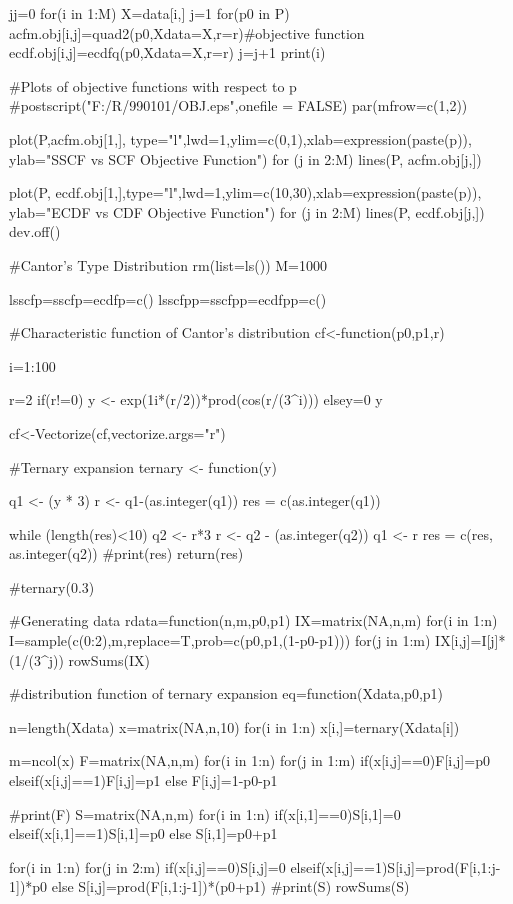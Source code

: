 jj=0
 for(i in 1:M)
 {
  X=data[i,]
          j=1
          for(p0 in P){
          acfm.obj[i,j]=quad2(p0,Xdata=X,r=r)#objective function
          ecdf.obj[i,j]=ecdfq(p0,Xdata=X,r=r)
          j=j+1
          }
  print(i)
}

#Plots of objective functions with respect to p
#postscript("F:/R/990101/OBJ.eps",onefile = FALSE)
par(mfrow=c(1,2))

plot(P,acfm.obj[1,], type="l",lwd=1,ylim=c(0,1),xlab=expression(paste(p)),
ylab="SSCF vs SCF Objective Function")
for (j in 2:M) lines(P, acfm.obj[j,])

plot(P, ecdf.obj[1,],type="l",lwd=1,ylim=c(10,30),xlab=expression(paste(p)),
ylab="ECDF vs CDF Objective Function")
for (j in 2:M) lines(P, ecdf.obj[j,])
dev.off()

#Cantor's Type Distribution
rm(list=ls())
M=1000

lsscfp=sscfp=ecdfp=c()
lsscfpp=sscfpp=ecdfpp=c()

#Characteristic function of Cantor's distribution
cf<-function(p0,p1,r){
i=1:100

r=2
    if(r!=0){
      y <- exp(1i*(r/2))*prod(cos(r/(3^i)))
    }
    else{y=0}
    y
}
cf<-Vectorize(cf,vectorize.args="r")

#Ternary expansion
ternary <- function(y) {
  q1 <- (y * 3) 
  r <- q1-(as.integer(q1))
  res = c(as.integer(q1))

  while (length(res)<10) {
   q2 <- r*3
   r <- q2 - (as.integer(q2))
   q1 <- r
   res = c(res, as.integer(q2))
#print(res)
  }
  return(res)
}
#ternary(0.3)

#Generating data
rdata=function(n,m,p0,p1){
IX=matrix(NA,n,m)
for(i in 1:n){
I=sample(c(0:2),m,replace=T,prob=c(p0,p1,(1-p0-p1)))
for(j in 1:m){
IX[i,j]=I[j]*(1/(3^j))
}
}
rowSums(IX)
}

#distribution function of ternary expansion
eq=function(Xdata,p0,p1){
n=length(Xdata)
x=matrix(NA,n,10)
for(i in 1:n)
{
x[i,]=ternary(Xdata[i])
}

m=ncol(x)
F=matrix(NA,n,m)
for(i in 1:n)
{
for(j in 1:m)
{
if(x[i,j]==0){F[i,j]=p0}
  else{if(x[i,j]==1){F[i,j]=p1}
   else {F[i,j]=1-p0-p1
  }
}
}
}

#print(F)
S=matrix(NA,n,m)
for(i in 1:n)
{
if(x[i,1]==0){S[i,1]=0}
    else{if(x[i,1]==1){S[i,1]=p0}
    else{ S[i,1]=p0+p1}
}
}

for(i in 1:n)
{
for(j in 2:m)
{
if(x[i,j]==0){S[i,j]=0}
   else{if(x[i,j]==1){S[i,j]=prod(F[i,1:j-1])*p0}
   else {S[i,j]=prod(F[i,1:j-1])*(p0+p1)}
}
}
}
#print(S)
rowSums(S)
}

